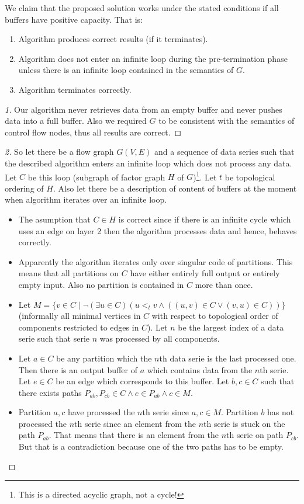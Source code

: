 \begin{claim}
We claim that the proposed solution works under the stated conditions if all buffers have positive capacity. That is:
\begin{enumerate}
  \item Algorithm produces correct results (if it terminates).
  \item Algorithm does not enter an infinite loop during the pre-termination phase unless there is an infinite loop contained in the semantics of $G$.
  \item Algorithm terminates correctly.
\end{enumerate}
\begin{proof}[1]
  Our algorithm never retrieves data from an empty buffer and never pushes data into a full buffer. Also we required $G$ to be consistent with the semantics of control flow nodes, thus all results are correct. 
\end{proof}
\begin{proof}[2] So let there be a flow graph $G(V,E)$ and a sequence of data series such that the described algorithm enters an infinite loop which does not process any data. Let $C$ be this loop (subgraph of factor graph $H$ of $G$)\footnote{This is a directed acyclic graph, not a cycle!}. Let $t$ be topological ordering of $H$. Also let there be a description of content of buffers at the moment when algorithm iterates over an infinite loop.
  \begin{itemize}
    \item The asumption that $C \in H$ is correct since if there is an infinite cycle which uses an edge on layer 2 then the algorithm processes data and hence, behaves correctly.
    \item Apparently the algorithm iterates only over singular code of partitions. This means that all partitions on $C$ have either entirely full output or entirely empty input. Also no partition is contained in $C$ more than once.
    \item Let $M = \{v \in C \mid \neg (\exists u \in C)( u <_t v \wedge ((u,v) \in C \vee (v,u) \in C ))\}$ (informally all minimal vertices in $C$ with respect to topological order of components restricted to edges in $C$). Let $n$ be the largest index of a data serie such that serie $n$ was processed by all components.
    \item Let $a \in C$ be any partition which the $n$th data serie is the last processed one. Then there is an output buffer of $a$ which contains data from the $n$th serie. Let $e \in C$ be an edge which corresponds to this buffer.  Let $b,c \in C$ such that there exists paths $P_{ab}, P_{cb} \in C \wedge e \in P_{ab} \wedge c \in M$. 
    \item Partition $a,c$ have processed the $n$th serie since $a,c \in M$. Partition $b$ has not processed the $n$th serie since an element from the $n$th serie is stuck on the path $P_{ab}$. That means that there is an element from the $n$th serie on path $P_{cb}$. But that is a contradiction because one of the two paths has to be empty.
  \end{itemize}


\end{proof}
\end{claim}
